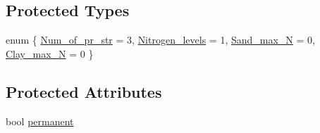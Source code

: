 \subsection*{Protected Types}
\begin{DoxyCompactItemize}
\item 
enum \{ \hyperlink{classstatic_clover_grass_aefc62d078dcbf30bc84e12d501b106baa7a96373c11f406076beea5d5b0bc92cb}{Num\_\-of\_\-pr\_\-str} = 3, 
\hyperlink{classstatic_clover_grass_aefc62d078dcbf30bc84e12d501b106baa1b63f244b007c552b212b924dc589cf8}{Nitrogen\_\-levels} = 1, 
\hyperlink{classstatic_clover_grass_aefc62d078dcbf30bc84e12d501b106baaef005ecaf2dcadc9c37e3124a6d4fa44}{Sand\_\-max\_\-N} = 0, 
\hyperlink{classstatic_clover_grass_aefc62d078dcbf30bc84e12d501b106baa0a9574b0adcf3d355205c02eba85c78f}{Clay\_\-max\_\-N} = 0
 \}
\end{DoxyCompactItemize}
\subsection*{Protected Attributes}
\begin{DoxyCompactItemize}
\item 
bool \hyperlink{classstatic_clover_grass_a92eeec31d30a8fbbe716a35a82603bba}{permanent}
\end{DoxyCompactItemize}


